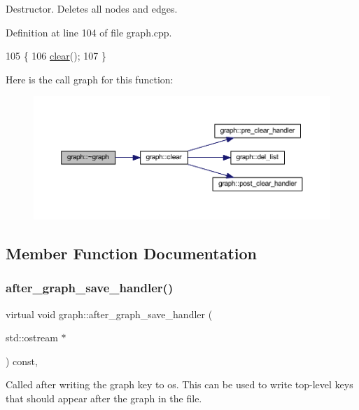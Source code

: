 Destructor. Deletes all nodes and edges. 

Definition at line 104 of file graph.\+cpp.


\begin{DoxyCode}
105 \{
106     \mbox{\hyperlink{classgraph_a9ff5d6af3653e79f87b836701453f55a}{clear}}();
107 \}
\end{DoxyCode}
Here is the call graph for this function\+:\nopagebreak
\begin{figure}[H]
\begin{center}
\leavevmode
\includegraphics[width=350pt]{classgraph_aeb62eaf197cdcb4800fa016eebc3d55a_cgraph}
\end{center}
\end{figure}


\subsection{Member Function Documentation}
\mbox{\label{classgraph_af0c7aba21d57d827ae96cae632441651}} 
\subsubsection{\texorpdfstring{after\+\_\+graph\+\_\+save\+\_\+handler()}{after\_graph\_save\_handler()}}
{\footnotesize\ttfamily virtual void graph\+::after\+\_\+graph\+\_\+save\+\_\+handler (\begin{DoxyParamCaption}\item[{std\+::ostream $\ast$}]{ }\end{DoxyParamCaption}) const\hspace{0.3cm}{\ttfamily [inline]}, {\ttfamily [virtual]}}

Called after writing the graph key to {\ttfamily os}. This can be used to write top-\/level keys that should appear after the graph in the file.


